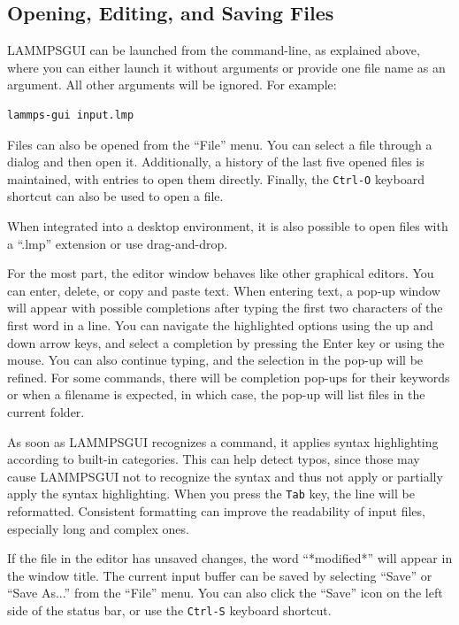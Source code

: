 \documentclass[9pt,tutorial]{livecoms}
\newcommand{\lammpsgui}{\textsf{LAMMPS\textendash GUI}}
\begin{document}
\begin{appendices}
\subsection{Opening, Editing, and Saving Files}

\lammpsgui{} can be launched from the command-line, as explained above, where you
can either launch it without arguments or provide one file name as an argument.  All
other arguments will be ignored.  For example:
\begin{lstlisting}[language=tcl]
lammps-gui input.lmp
\end{lstlisting}
Files can also be opened from the ``File'' menu.  You can select a
file through a dialog and then open it.  Additionally, a history of
the last five opened files is maintained, with entries to open them directly.
Finally, the \texttt{Ctrl-O} keyboard shortcut can also be used to open a file.

When integrated into a desktop environment, it is also possible to open
files with a ``.lmp'' extension or use drag-and-drop.

For the most part, the editor window behaves like other graphical
editors.  You can enter, delete, or copy and paste text.   When entering
text, a pop-up window will appear with possible completions after typing
the first two characters of the first word in a line.  You can
navigate the highlighted options using the up and down arrow keys, and select a
completion by pressing the Enter key or using the mouse.  You can also continue
typing, and the selection in the pop-up will be refined.  For some
commands, there will be completion pop-ups for their
keywords or when a filename is expected, in which case,
the pop-up will list files in the current folder.

As soon as \lammpsgui{} recognizes a command, it applies syntax
highlighting according to built-in categories.  This can help
detect typos, since those may cause \lammpsgui{} not to
recognize the syntax and thus not apply or partially apply
the syntax highlighting.  When you press the \texttt{Tab} key, the line will be
reformatted.  Consistent formatting can improve the readability of
input files, especially long and complex ones.

If the file in the editor has unsaved changes, the word
``*modified*'' will appear in the window title.  The current input
buffer can be saved by selecting ``Save'' or ``Save As...'' from the
``File'' menu.  You can also click the ``Save'' icon on the left side
of the status bar, or use the \texttt{Ctrl-S} keyboard shortcut.


\end{appendices}
\end{document}
